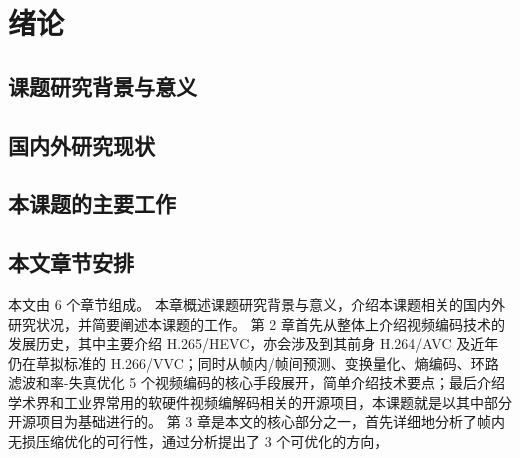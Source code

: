 \chapter{绪论}
\label{cha:c1}

\section{课题研究背景与意义}

\section{国内外研究现状}

\section{本课题的主要工作}

\section{本文章节安排}
本文由 6 个章节组成。
本章概述课题研究背景与意义，介绍本课题相关的国内外研究状况，并简要阐述本课题的工作。
第 2 章首先从整体上介绍视频编码技术的发展历史，其中主要介绍 H.265/HEVC，亦会涉及到其前身 H.264/AVC 及近年仍在草拟标准的 H.266/VVC；同时从帧内/帧间预测、变换量化、熵编码、环路滤波和率-失真优化 5 个视频编码的核心手段展开，简单介绍技术要点；最后介绍学术界和工业界常用的软硬件视频编解码相关的开源项目，本课题就是以其中部分开源项目为基础进行的。
第 3 章是本文的核心部分之一，首先详细地分析了帧内无损压缩优化的可行性，通过分析提出了 3 个可优化的方向，
